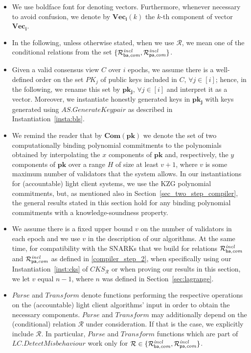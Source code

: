 \begin{itemize}
\item We use boldface font for denoting vectors. Furthermore, whenever necessary to avoid confusion, 
we denote by $\mathbf{Vec_i}(k)$ the $k$-th component of vector $\mathbf{Vec_i}$. 

\item In the following, unless otherwise stated, when we use $\mathcal{R}$, we mean one of the conditional relations from the set 
$\{ \mathcal{R}^{\mathit{incl}}_{\mathsf{ba},\mathit{com}}, \mathcal{R}^{\mathit{incl}}_{\mathsf{pa},\mathit{com}}\}$.%

\item Given a valid consensus view $C$ over $i$ epochs, we assume there is a well-defined order on the set $\mathit{PK_j}$  
of public keys included in $C$, $\forall j \in [i]$; hence, in the following, we rename this set by $\mathbf{pk_j}$, $\forall j \in [i]$ 
and interpret it as a vector. Moreover, we instantiate honestly generated keys in $\mathbf{pk_j}$ with keys generated using 
$\mathit{AS.GenerateKeypair}$ as described in Instantiation~\ref{insta:bls}.
  
\item We remind the reader that by $\mathbf{Com}(\mathbf{pk})$ we denote the set of two computationally binding polynomial 
commitments to the polynomials obtained by interpolating the $x$ components of $\mathbf{pk}$ and, respectively, the $y$ 
components of $\mathbf{pk}$ over a range $H$ of size at least $v+1$, where $v$ is some maximum number of validators that the system allows. 
In our instantiations for (accountable) light client systems, we use the KZG polynomial commitments, but, as mentioned also in 
Section~\ref{sec_two_step_compiler}, the general results stated in this section hold for any binding polynomial commitments with a knowledge-soundness property.

\item We assume there is a fixed upper bound $v$ on the number of validators in each epoch and we use $v$ in the description of our algorithms. 
At the same time, for compatibility with the SNARKs that we build for relations $\mathcal{R}^{\mathit{incl}}_{\mathsf{ba},\mathit{com}}$ and $\mathcal{R}^{\mathit{incl}}_{\mathsf{pa},\mathit{com}}$ as defined 
in \ref{compiler_step_2}, when specifically using our Instantiation~\ref{inst:cks} of $\mathit{CKS_{\mathcal{R}}}$ or when proving our results in this section, we 
let $v$ equal $n-1$, where $n$ was defined in Section~\ref{sec:lagrange}. 

\item $\mathit{Parse}$ and $\mathit{Transform}$ denote functions performing the respective operations on the 
(accountable) light client algorithms' input in order to obtain the necessary components. $\mathit{Parse}$ and $\mathit{Transform}$ 
may additionally depend on the (conditional) relation $\mathcal{R}$ under consideration. If that is the case, we explicitly include 
$\mathcal{R}$. In particular, $\mathit{Parse}$ and $\mathit{Transform}$ functions which are part of $\mathit{LC.DetectMisbehaviour}$ 
work only for $\mathcal{R} \in \{ \mathcal{R}^{\mathit{incl}}_{\mathsf{ba},\mathit{com}}, \mathcal{R}^{\mathit{incl}}_{\mathsf{pa},\mathit{com}} \}$. 


\end{itemize}
